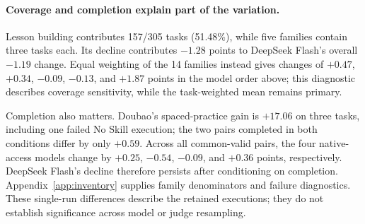 \paragraph{Coverage and completion explain part of the variation.}
Lesson building contributes 157/305 tasks (51.48\%), while five families
contain three tasks each. Its decline contributes $-1.28$ points to DeepSeek
Flash's overall $-1.19$ change. Equal weighting of the 14 families instead
gives changes of $+0.47$, $+0.34$, $-0.09$, $-0.13$, and $+1.87$ points
in the model order above; this diagnostic describes coverage sensitivity,
while the task-weighted mean remains primary.

Completion also matters. Doubao's spaced-practice gain is $+17.06$ on three
tasks, including one failed No Skill execution; the two pairs completed in
both conditions differ by only $+0.59$. Across all common-valid pairs, the
four native-access models change by $+0.25$, $-0.54$, $-0.09$, and $+0.36$
points, respectively. DeepSeek Flash's decline therefore persists after
conditioning on completion. Appendix~\ref{app:inventory} supplies family
denominators and failure diagnostics. These single-run differences describe
the retained executions; they do not establish significance across model
or judge resampling.
